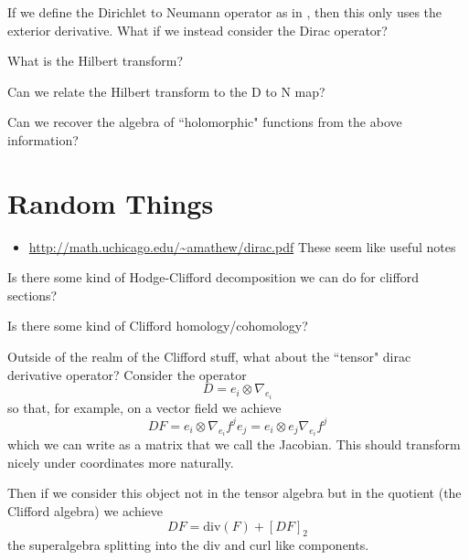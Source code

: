 \begin{question}
If we define the Dirichlet to Neumann operator as in \cite{clay_d-to-n_map}, then this only uses the exterior derivative. What if we instead consider the Dirac operator?
\end{question}

\begin{question}
What is the Hilbert transform?
\end{question}

\begin{question}
Can we relate the Hilbert transform to the D to N map?
\end{question}

\begin{question}
Can we recover the algebra of ``holomorphic" functions from the above information?
\end{question}

\section{Random Things}


\begin{itemize}
    \item \url{http://math.uchicago.edu/~amathew/dirac.pdf} These seem like useful notes
\end{itemize}

\begin{question}
    Is there some kind of Hodge-Clifford decomposition we can do for clifford sections?
\end{question}

\begin{question}
Is there some kind of Clifford homology/cohomology?
\end{question}

Outside of the realm of the Clifford stuff, what about the ``tensor" dirac derivative operator?  Consider the operator
\[
D = e_i \otimes \nabla_{e_i}
\]
so that, for example, on a vector field we achieve
\[
DF = e_i \otimes \nabla_{e_i}f^j e_j = e_i \otimes e_j \nabla_{e_i} f^j
\]
which we can write as a matrix that we call the Jacobian. This should transform nicely under coordinates more naturally.

Then if we consider this object not in the tensor algebra but in the quotient (the Clifford algebra) we achieve
\[
DF = \textrm{div}(F) + [DF]_2
\]
the superalgebra splitting into the div and curl like components.

